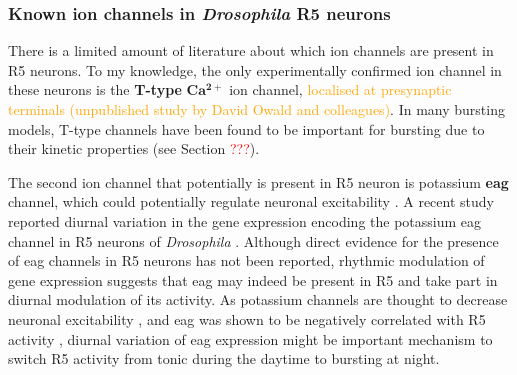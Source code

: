 \documentclass[../main.tex]{subfiles}
\begin{document}



\subsubsection{Known ion channels in \textit{Drosophila} R5 neurons} \label{subsubsect:known_channels_in_r5}
There is a limited amount of literature about which ion channels are present in R5 neurons. To my knowledge, the only experimentally confirmed ion channel in these neurons is the \textbf{T-type} \( \mathbf{Ca^{2+}} \) ion channel, \textcolor{orange}{localised at presynaptic terminals (unpublished study by David Owald and colleagues)}. In many bursting models, T-type channels have been found to be important for bursting due to their kinetic properties (see Section \textcolor{red}{???}).

The second ion channel that potentially is present in R5 neuron is potassium \textbf{\gls{eag}} channel, which could potentially regulate neuronal excitability \cite{bruggemannEtheragogoEncodesVoltagegated1993}. A recent study reported diurnal variation in the gene expression encoding the potassium \gls{eag} channel in R5 neurons of \textit{Drosophila} \cite{doppSinglecellTranscriptomicsReveals2024}. Although direct evidence for the presence of \gls{eag} channels in R5 neurons has not been reported, rhythmic modulation of gene expression suggests that \gls{eag} may indeed be present in R5 and take part in diurnal modulation of its activity.
As potassium channels are thought to decrease neuronal excitability \cite{bruggemannEtheragogoEncodesVoltagegated1993}, and \gls{eag} was shown to be negatively correlated
with R5 activity \cite{doppSinglecellTranscriptomicsReveals2024}, diurnal variation of \gls{eag} expression might be important mechanism to switch R5 activity from tonic during the daytime to bursting at night.
\end{document}
